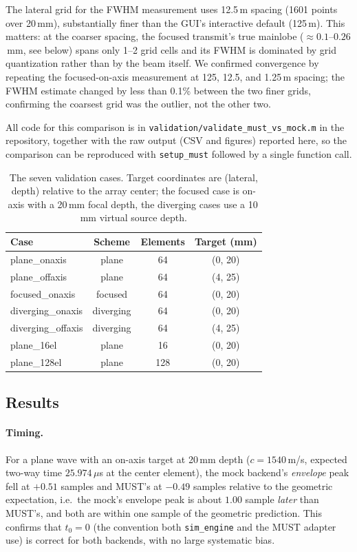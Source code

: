 \documentclass[11pt]{article}
\newcommand{\code}[1]{\texttt{#1}}
\newcommand{\must}{MUST}
\begin{document}
The lateral grid for the FWHM measurement uses 12.5\,\textmu m spacing
(1601 points over 20\,mm), substantially finer than the GUI's interactive
default (125\,\textmu m). This matters: at the coarser spacing, the focused
transmit's true mainlobe ($\approx 0.1$--$0.26$\,mm, see below) spans only
1--2 grid cells and its FWHM is dominated by grid quantization rather than
by the beam itself. We confirmed convergence by repeating the
focused-on-axis measurement at 125, 12.5, and 1.25\,\textmu m spacing; the
FWHM estimate changed by less than 0.1\% between the two finer grids,
confirming the coarsest grid was the outlier, not the other two.

All code for this comparison is in \code{validation/validate\_must\_vs\_mock.m}
in the repository, together with the raw output (CSV and figures) reported
here, so the comparison can be reproduced with \code{setup\_must} followed by
a single function call.

\begin{table}[t]
  \centering
  \caption{The seven validation cases. Target coordinates are (lateral,
  depth) relative to the array center; the focused case is on-axis with a
  20\,mm focal depth, the diverging cases use a 10\,mm virtual source
  depth.}
  \label{tab:cases}
  \begin{tabular}{lccc}
    \toprule
    Case & Scheme & Elements & Target (mm) \\
    \midrule
    plane\_onaxis      & plane      & 64  & (0, 20) \\
    plane\_offaxis     & plane      & 64  & (4, 25) \\
    focused\_onaxis    & focused    & 64  & (0, 20) \\
    diverging\_onaxis  & diverging  & 64  & (0, 20) \\
    diverging\_offaxis & diverging  & 64  & (4, 25) \\
    plane\_16el        & plane      & 16  & (0, 20) \\
    plane\_128el       & plane      & 128 & (0, 20) \\
    \bottomrule
  \end{tabular}
\end{table}

\subsection{Results}

\paragraph{Timing.} For a plane wave with an on-axis target at 20\,mm depth
($c=1540$\,m/s, expected two-way time $25.974\,\mu$s at the center element),
the mock backend's \emph{envelope} peak fell at $+0.51$ samples and \must's
at $-0.49$ samples relative to the geometric expectation, i.e.\ the mock's
envelope peak is about $1.00$ sample \emph{later} than \must's, and both are
within one sample of the geometric prediction. This confirms that $t_0 = 0$
(the convention both \code{sim\_engine} and the \must{} adapter use) is
correct for both backends, with no large systematic bias.
\end{document}
